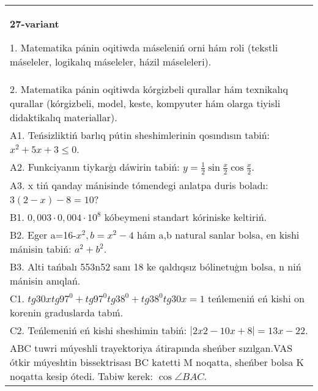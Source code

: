 \documentclass{article}
\begin{document}
\begin{tabular}{m{17cm}}
\textbf{27-variant}

1. Matematika pánin oqitiwda máseleniń orni hám roli (tekstli máseleler, logikalıq máseleler, házil máseleleri). \\
2. Matematika pánin oqitiwda kórgizbeli qurallar hám texnikalıq qurallar (kórgizbeli, model, keste, kompyuter hám olarga tiyisli didaktikalıq materiallar). \\
A1. Teńsizliktiń barlıq pútin sheshimlerinin qosındısın tabiń: \(x^2 + 5x + 3 \leq 0\). \\
A2. Funkciyanın tiykarģı dáwirin tabiń: \(y = \frac{1}{2}\sin{\frac{x}{2}\cos\frac{x}{2}}\). \\
A3. x tiń qanday mánisinde tómendegi anlatpa duris boladı: \(3 (2 - x) - 8 = 10\)? \\
B1. \(0,003 \cdot 0,004 \cdot 10^{8}\) kóbeymeni standart kóriniske keltiriń. \\
B2. Eger a=16-\(x^2, b=x^2 - 4\) hám a,b natural sanlar bolsa, en kishi mánisin tabiń: \(a^2 + b^2\). \\
B3. Alti tańbalı 553n52 sanı 18 ke qaldıqsız bólinetuģın bolsa, n niń mánisin anıqlań. \\
C1. \(tg30xtg97^{0} + tg97^{0}tg38^{0} + tg38^{0}tg30x = 1\) teńlemeniń eń kishi on korenin graduslarda tabıń. \\
C2. Teńlemeniń eń kishi sheshimin tabiń: \(\left| 2x2 - 10x + 8 \right| = 13x - 22\). \\
ABC tuwri múyeshli trayektoriya átirapında sheńber sızılgan.VAS ótkir múyeshtin bissektrisası BC katetti M noqatta, sheńber bolsa K noqatta kesip ótedi. Tabiw kerek: \(\cos\angle BAC\). \\

\end{tabular}
\vspace{1cm}
\end{document}
